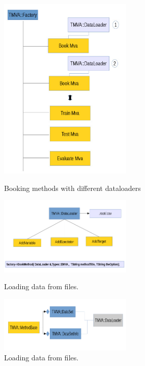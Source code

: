 \documentclass[a4paper]{jpconf}
\begin{document}
\begin{figure}[h]
\begin{minipage}{15pc}
\includegraphics[width=15pc]{img/dl1.jpg}
\caption{\label{dl1}Booking methods with different dataloaders}
\end{minipage}\hspace{2pc}%
\begin{minipage}{15pc}
\includegraphics[width=15pc]{img/dl2.jpg}
\caption{\label{dl2}Loading data from files.}
\includegraphics[width=15pc]{img/dl3.jpg}
\caption{\label{dl3}Loading data from files.}
\end{minipage} 
\end{figure}
\end{document}
